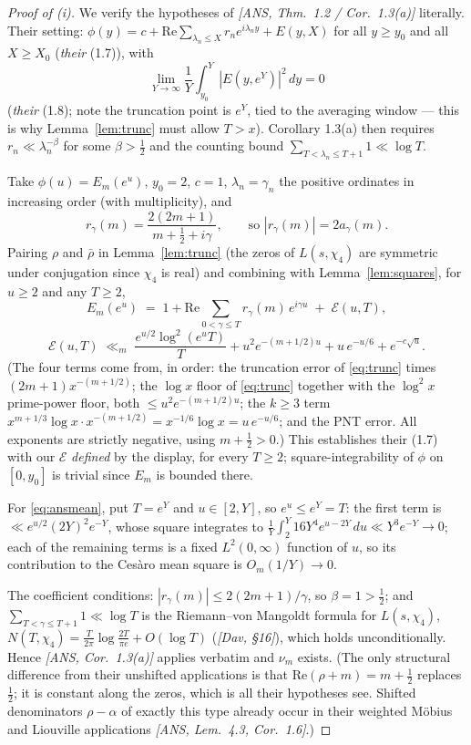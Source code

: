 \begin{proof}[Proof of (i)]
We verify the hypotheses of \emph{[ANS, Thm.~1.2 / Cor.~1.3(a)]}
literally. Their setting: $\phi(y)=c+\mathrm{Re}\sum_{\lambda_n\le X}
r_ne^{i\lambda_ny}+E(y,X)$ for all $y\ge y_0$ and all $X\ge X_0$
(\emph{their} (1.7)), with
\begin{equation}\label{eq:ansmean}
\lim_{Y\to\infty}\frac1Y\int_{y_0}^{Y}|E(y,e^{Y})|^2\,dy=0
\end{equation}
(\emph{their} (1.8); note the truncation point is $e^Y$, tied to the
averaging window --- this is why Lemma~\ref{lem:trunc} must allow
$T>x$). Corollary 1.3(a) then requires $r_n\ll\lambda_n^{-\beta}$ for
some $\beta>\tfrac12$ and the counting bound
$\sum_{T<\lambda_n\le T+1}1\ll\log T$.

Take $\phi(u)=E_m(e^u)$, $y_0=2$, $c=1$, $\lambda_n=\gamma_n$ the
positive ordinates in increasing order (with multiplicity), and
\[
r_{\gamma}(m)=\frac{2(2m+1)}{m+\tfrac12+i\gamma},
\qquad\text{so } |r_\gamma(m)|=2a_\gamma(m).
\]
Pairing $\rho$ and $\bar\rho$ in Lemma~\ref{lem:trunc} (the zeros of
$L(s,\chi_4)$ are symmetric under conjugation since $\chi_4$ is real)
and combining with Lemma~\ref{lem:squares}, for $u\ge2$ and any
$T\ge2$,
\[
E_m(e^u)\;=\;1+\mathrm{Re}\!\!\sum_{0<\gamma\le T}\!\! r_\gamma(m)\,
e^{i\gamma u}\;+\;\mathcal E(u,T),
\]
\[
\mathcal E(u,T)\;\ll_m\;
\frac{e^{u/2}\log^2(e^uT)}{T}
+u^2e^{-(m+1/2)u}
+u\,e^{-u/6}
+e^{-c\sqrt{u}} .
\]
(The four terms come from, in order: the truncation error of
\eqref{eq:trunc} times $(2m+1)x^{-(m+1/2)}$; the $\log x$ floor of
\eqref{eq:trunc} together with the $\log^2x$ prime-power floor, both
$\le u^2e^{-(m+1/2)u}$; the $k\ge3$ term
$x^{m+1/3}\log x\cdot x^{-(m+1/2)}= x^{-1/6}\log x=u\,e^{-u/6}$; and
the PNT error. All exponents are strictly negative, using
$m+\tfrac12>0$.) This establishes their (1.7) with our $\mathcal E$
\emph{defined} by the display, for every $T\ge2$; square-integrability
of $\phi$ on $[0,y_0]$ is trivial since $E_m$ is bounded there.

For \eqref{eq:ansmean}, put $T=e^{Y}$ and $u\in[2,Y]$, so
$e^u\le e^Y=T$: the first term is
$\ll e^{u/2}(2Y)^2e^{-Y}$, whose square integrates to
$\frac1Y\int_2^Y 16Y^4e^{u-2Y}\,du\ll Y^3e^{-Y}\to0$; each of the
remaining terms is a fixed $L^2(0,\infty)$ function of $u$, so its
contribution to the Ces\`aro mean square is $O_m(1/Y)\to0$.

The coefficient conditions: $|r_\gamma(m)|\le2(2m+1)/\gamma$, so
$\beta=1>\tfrac12$; and $\sum_{T<\gamma\le T+1}1\ll\log T$ is the
Riemann--von Mangoldt formula for $L(s,\chi_4)$,
$N(T,\chi_4)=\frac{T}{2\pi}\log\frac{2T}{\pi e}+O(\log T)$
(\emph{[Dav, \S16]}), which holds unconditionally. Hence
\emph{[ANS, Cor.~1.3(a)]} applies verbatim and $\nu_m$ exists. (The
only structural difference from their unshifted applications is that
$\mathrm{Re}(\rho+m)=m+\tfrac12$ replaces $\tfrac12$; it is constant
along the zeros, which is all their hypotheses see. Shifted
denominators $\rho-\alpha$ of exactly this type already occur in their
weighted M\"obius and Liouville applications \emph{[ANS, Lem.~4.3,
Cor.~1.6]}.)


\end{proof}
